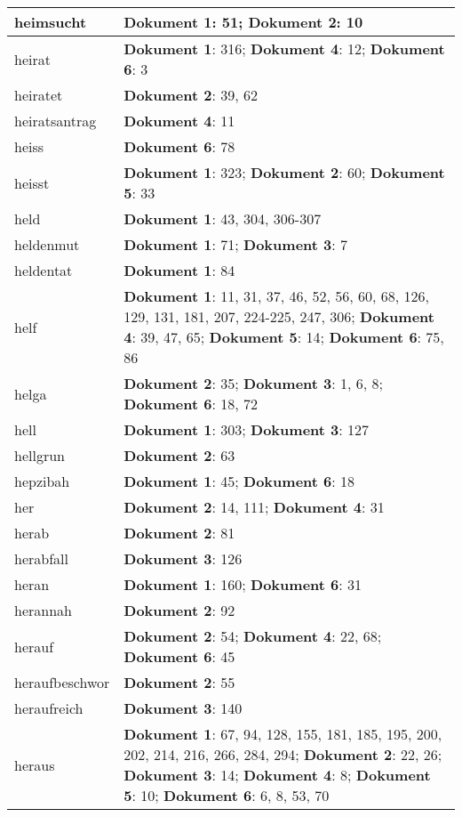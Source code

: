 \documentclass[a5paper]{article}
\begin{document}
\begin{longtable}[l]{|l|p{3in}|}
\hline
heimsucht & \textbf{Dokument 1}: 51; \textbf{Dokument 2}: 10 \\
\hline
heirat & \textbf{Dokument 1}: 316; \textbf{Dokument 4}: 12; \textbf{Dokument 6}: 3 \\
\hline
heiratet & \textbf{Dokument 2}: 39, 62 \\
\hline
heiratsantrag & \textbf{Dokument 4}: 11 \\
\hline
heiss & \textbf{Dokument 6}: 78 \\
\hline
heisst & \textbf{Dokument 1}: 323; \textbf{Dokument 2}: 60; \textbf{Dokument 5}: 33 \\
\hline
held & \textbf{Dokument 1}: 43, 304, 306-307 \\
\hline
heldenmut & \textbf{Dokument 1}: 71; \textbf{Dokument 3}: 7 \\
\hline
heldentat & \textbf{Dokument 1}: 84 \\
\hline
helf & \textbf{Dokument 1}: 11, 31, 37, 46, 52, 56, 60, 68, 126, 129, 131, 181, 207, 224-225, 247, 306; \textbf{Dokument 4}: 39, 47, 65; \textbf{Dokument 5}: 14; \textbf{Dokument 6}: 75, 86 \\
\hline
helga & \textbf{Dokument 2}: 35; \textbf{Dokument 3}: 1, 6, 8; \textbf{Dokument 6}: 18, 72 \\
\hline
hell & \textbf{Dokument 1}: 303; \textbf{Dokument 3}: 127 \\
\hline
hellgrun & \textbf{Dokument 2}: 63 \\
\hline
hepzibah & \textbf{Dokument 1}: 45; \textbf{Dokument 6}: 18 \\
\hline
her & \textbf{Dokument 2}: 14, 111; \textbf{Dokument 4}: 31 \\
\hline
herab & \textbf{Dokument 2}: 81 \\
\hline
herabfall & \textbf{Dokument 3}: 126 \\
\hline
heran & \textbf{Dokument 1}: 160; \textbf{Dokument 6}: 31 \\
\hline
herannah & \textbf{Dokument 2}: 92 \\
\hline
herauf & \textbf{Dokument 2}: 54; \textbf{Dokument 4}: 22, 68; \textbf{Dokument 6}: 45 \\
\hline
heraufbeschwor & \textbf{Dokument 2}: 55 \\
\hline
heraufreich & \textbf{Dokument 3}: 140 \\
\hline
heraus & \textbf{Dokument 1}: 67, 94, 128, 155, 181, 185, 195, 200, 202, 214, 216, 266, 284, 294; \textbf{Dokument 2}: 22, 26; \textbf{Dokument 3}: 14; \textbf{Dokument 4}: 8; \textbf{Dokument 5}: 10; \textbf{Dokument 6}: 6, 8, 53, 70 \\

\end{longtable}
\end{document}
